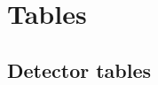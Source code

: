 
\chapter{Tables} %

\label{AppendixF} %

\section{Detector tables}
\label{AppendixF:detector-tables}

